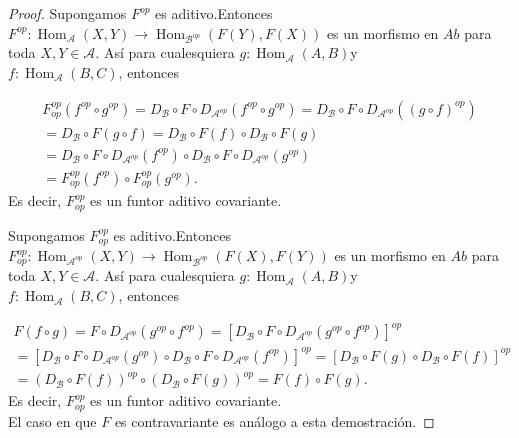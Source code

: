 \documentclass{article}
\begin{document}
\begin{enumerate}[label=\textbf{Ej \arabic*.}]
\begin{proof}
 Supongamos $F^{op}$ es aditivo.Entonces \\$F^{op}:\operatorname{Hom}_{\mathscr{A}}(X,Y)\longrightarrow
\operatorname{Hom}_{\mathscr{B}^{op}}(F(Y),F(X))$ es un morfismo en $Ab$ para toda $X,Y\in \mathscr{A}$. Así para cualesquiera
$g:\operatorname{Hom}_{\mathscr{A}}(A,B)$\quad y\\
$f:\operatorname{Hom}_{\mathscr{A}}(B,C)$, entonces

\begin{gather*}
F_{op}^{op}(f^{op}\circ g^{op})=D_{\mathscr{B}}\circ F \circ D_{\mathscr{A}^{op}}(f^{op}\circ g^{op})
=D_{\mathscr{B}}\circ F \circ D_{\mathscr{A}^{op}}((g\circ f)^{op})\\
=D_{\mathscr{B}}\circ F (g\circ f)=D_{\mathscr{B}}\circ F(f)\circ D_{\mathscr{B}}\circ F(g)\\
=D_{\mathscr{B}}\circ F \circ D_{\mathscr{A}^{op}}(f^{op})\circ D_{\mathscr{B}}\circ F \circ D_{\mathscr{A}^{op}}(g^{op})\\
=F_{op}^{op}(f^{op})\circ F_{op}^{op}(g^{op}).
\end{gather*}
Es decir, $F_{op}^{op}$ es un funtor aditivo covariante.

 Supongamos $F_{op}^{op}$ es aditivo.Entonces \\$F_{op}^{op}:\operatorname{Hom}_{\mathscr{A}^{op}}(X,Y)\longrightarrow
\operatorname{Hom}_{\mathscr{B}^{op}}(F(X),F(Y))$ es un morfismo en $Ab$ para toda $X,Y\in \mathscr{A}$. Así para cualesquiera
$g:\operatorname{Hom}_{\mathscr{A}}(A,B)$\quad y\\
$f:\operatorname{Hom}_{\mathscr{A}}(B,C)$, entonces

\begin{gather*}
F(f\circ g)=F\circ D_{\mathscr{A}^{op}}(g^{op}\circ f^{op})=[D_{\mathscr{B}}\circ F \circ D_{\mathscr{A}^{op}}(g^{op}\circ f^{op})]^{op}\\
=[D_{\mathscr{B}}\circ F \circ D_{\mathscr{A}^{op}}(g^{op})\circ D_{\mathscr{B}}\circ F \circ D_{\mathscr{A}^{op}}(f^{op})]^{op}
=[D_{\mathscr{B}}\circ F(g)\circ D_{\mathscr{B}}\circ F(f)]^{op}\\
=(D_{\mathscr{B}}\circ F(f))^{op}\circ (D_{\mathscr{B}}\circ F(g))^{op}= F(f)\circ F(g).
\end{gather*}
Es decir, $F_{op}^{op}$ es un funtor aditivo covariante.\\

El caso en que $F$ es contravariante es análogo a esta demostración.
\end{proof}


\end{enumerate}
\end{document}
